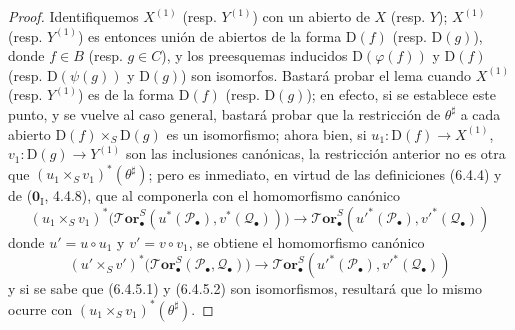 \begin{proof}
Identifiquemos $X^{(1)}$ (resp. $Y^{(1)}$) con un abierto de $X$ (resp. $Y$);
$X^{(1)}$ (resp. $Y^{(1)}$) es entonces unión de abiertos de la forma
$\mathrm D(f)$ (resp. $\mathrm D(g)$), donde $f\in B$ (resp. $g\in C$), y los
preesquemas inducidos $\mathrm D(\varphi(f))$ y $\mathrm D(f)$ (resp.
$\mathrm D(\psi(g))$ y $\mathrm D(g)$) son isomorfos. Bastará probar
el lema cuando $X^{(1)}$ (resp. $Y^{(1)}$) es de la forma $\mathrm D(f)$
(resp. $\mathrm D(g)$); en efecto, si se establece este punto, y se vuelve al
caso general, bastará probar que la restricción de $\theta^\sharp$ a
cada abierto $\mathrm D(f)\times_S\mathrm D(g)$ es un isomorfismo; ahora bien, si
$u_1:\mathrm D(f)\to X^{(1)}$, $v_1:\mathrm D(g)\to Y^{(1)}$ son las
inclusiones canónicas, la restricción anterior no es otra que
$(u_1\times_S v_1)^*(\theta^\sharp)$; pero es inmediato, en virtud de las
definiciones (6.4.4) y de ($\mathbf{0}_{\mathrm I}$, 4.4.8), que al componerla con
el homomorfismo canónico
\[
  (u_1\times_S v_1)^*
  \bigl(\boldsymbol{\mathscr{T}\!or}_\bullet^S
    (u^*(\mathscr P_\bullet),v^*(\mathscr Q_\bullet))\bigr)
  \longrightarrow
  \boldsymbol{\mathscr{T}\!or}_\bullet^S
  (u'^*(\mathscr P_\bullet),v'^*(\mathscr Q_\bullet))
  \tag{6.4.5.1}\label{III.6.4.5.1.fr}
\]
donde $u'=u\circ u_1$ y $v'=v\circ v_1$, se obtiene el homomorfismo canónico
\[
  (u'\times_S v')^*
  \bigl(\boldsymbol{\mathscr{T}\!or}_\bullet^S(\mathscr P_\bullet,\mathscr Q_\bullet)\bigr)
  \longrightarrow
  \boldsymbol{\mathscr{T}\!or}_\bullet^S
  (u'^*(\mathscr P_\bullet),v'^*(\mathscr Q_\bullet))
  \tag{6.4.5.2}\label{III.6.4.5.2.fr}
\]
y si se sabe que (6.4.5.1) y (6.4.5.2) son isomorfismos,
resultará que lo mismo ocurre con $(u_1\times_S v_1)^*(\theta^\sharp)$.


\end{proof}

